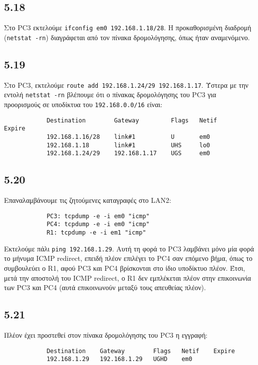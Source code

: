 \documentclass[a4paper, 12pt]{article}
\begin{document}
	\subsection*{5.18}
		Στο PC3 εκτελούμε \verb|ifconfig em0 192.168.1.18/28|. Η προκαθορισμένη διαδρομή (\verb|netstat -rn|) διαγράφεται από τον πίνακα δρομολόγησης, όπως ήταν αναμενόμενο.

	\subsection*{5.19}
		Στο PC3, εκτελούμε \verb|route add 192.168.1.24/29 192.168.1.17|. Ύστερα με την εντολή \verb|netstat -rn| βλέπουμε ότι ο πίνακας δρομολόγησης του PC3 για προορισμούς σε υποδίκτυα του \verb|192.168.0.0/16| είναι:
		
		\begin{verbatim}
			Destination        Gateway         Flags   Netif     Expire
			192.168.1.16/28    link#1          U       em0
			192.168.1.18       link#1          UHS     lo0
			192.168.1.24/29    192.168.1.17    UGS     em0
		\end{verbatim}

	\subsection*{5.20}
		Επαναλαμβάνουμε τις ζητούμενες καταγραφές στο LAN2:
		
		\begin{verbatim}
			PC3: tcpdump -e -i em0 "icmp"
			PC4: tcpdump -e -i em0 "icmp"
			R1: tcpdump -e -i em1 "icmp"
		\end{verbatim}
		
		Εκτελούμε πάλι \verb|ping 192.168.1.29|. Αυτή τη φορά το PC3 λαμβάνει μόνο μία φορά το μήνυμα ICMP redirect, επειδή πλέον επιλέγει το PC4 σαν επόμενο βήμα, όπως το συμβουλεύει ο R1, αφού PC3 και PC4 βρίσκονται στο ίδιο υποδίκτυο πλέον. Έτσι, μετά την αποστολή του ICMP redirect, ο R1 δεν εμπλέκεται πλέον στην επικοινωνία των PC3 και PC4 (αυτά επικοινωνούν μεταξύ τους απευθείας πλέον).

	\subsection*{5.21}
		Πλέον έχει προστεθεί στον πίνακα δρομολόγησης του PC3 η εγγραφή: 
		
		\begin{verbatim}
			Destination    Gateway        Flags   Netif    Expire
			192.168.1.29   192.168.1.29   UGHD    em0
		\end{verbatim}
		
\end{document}

